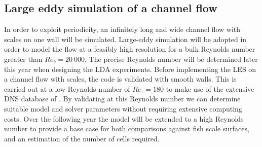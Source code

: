 \documentclass[12pt,oneside,a4paper]{article}
\begin{document}
\subsection{Large eddy simulation of a channel flow}
\label{section:les}
In order to exploit periodicity, an infinitely long and wide channel flow with scales on one wall will be simulated. Large-eddy simulation will be adopted in order to model the flow at a feasibly high resolution for a bulk Reynolds number greater than $Re_b = 20\ 000$. The precise Reynolds number will be determined later this year when designing the LDA experiments. Before implementing the LES on a channel flow with scales, the code is validated with smooth walls. This is carried out at a low Reynolds number of $Re_\tau = 180$ to make use of the extensive DNS database of \cite{vreman2014}. By validating at this Reynolds number we can determine suitable model and solver parameters without requiring extensive computing costs. Over the following year the model will be extended to a high Reynolds number to provide a base case for both comparisons against fish scale surfaces, and an estimation of the number of cells required.
\end{document}
